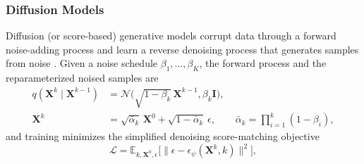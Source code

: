     \subsubsection{Diffusion Models}
    Diffusion (or score-based) generative models corrupt data through
    a forward noise-adding process and learn a reverse denoising
    process that generates samples from noise \cite{ho2020denoising}.
    Given a noise schedule \(\beta_1,\dots,\beta_K\), the forward
    process and the reparameterized noised samples are
    \begin{equation}
      \begin{split}
        q(\mathbf{X}^k \mid \mathbf{X}^{k-1}) &=
        \mathcal{N}\big(\sqrt{1-\beta_k}\,\mathbf{X}^{k-1},
        \beta_k \mathbf{I}\big), \\
        \mathbf{X}^k &= \sqrt{\bar\alpha_k}\, \mathbf{X}^0 +
        \sqrt{1-\bar\alpha_k}\, \epsilon,
        \qquad \bar\alpha_k = \prod_{i=1}^k (1-\beta_i),
      \end{split}
      \label{eq:ddpm-forward}
    \end{equation}
    and training minimizes the simplified denoising score-matching
    objective
    \begin{equation}
      \mathcal{L} = \mathbb{E}_{k, \mathbf{X}^0, \epsilon}\Big[
      \big\|\epsilon - \epsilon_\psi(\mathbf{X}^k, k)\big\|^2\Big],
      \label{eq:ddpm}
    \end{equation}

